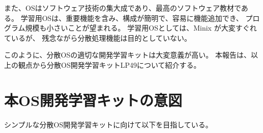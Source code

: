 \documentclass{ipsjpapers}
\begin{document}
  また、OSはソフトウェア技術の集大成であり、最高のソフトウェア教材である。
学習用OSは、重要機能を含み、構成が簡明で、容易に機能追加でき、
プログラム規模も小さいことが望まれる。
学習用OSとしては、Minix が大変すぐれているが、
残念ながら分散処理機能は目的としていない。

このように、分散OSの適切な開発学習キットは大変意義が高い。
本報告は、以上の観点から分散OS開発学習キットLP49について紹介する。


\section{本OS開発学習キットの意図}\label{sec:Enum}\label{sec:item}

シンプルな分散OS開発学習キットに向けて以下を目指している。
\end{document}

